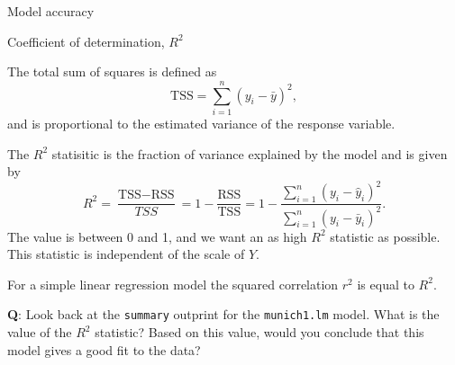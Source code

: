 \documentclass[ignorenonframetext,]{beamer}
\begin{document}
\begin{frame}

\begin{block}{Model accuracy}

\begin{block}{Coefficient of determination, \(R^2\)}

The total sum of squares is defined as
\[\text{TSS} = \sum_{i=1}^n (y_i - \bar{y})^2,\] and is proportional to
the estimated variance of the response variable.

The \(R^2\) statisitic is the fraction of variance explained by the
model and is given by
\[R^2 = \frac{\text{TSS}-\text{RSS}}{TSS}= 1-\frac{\text{RSS}}{\text{TSS}}=1-\frac{\sum_{i=1}^n(y_i-\hat{y}_i)^2}{\sum_{i=1}^n(y_i-\bar{y}_i)^2}.\]
The value is between 0 and 1, and we want an as high \(R^2\) statistic
as possible. This statistic is independent of the scale of \(Y\).

\end{block}

\end{block}

\end{frame}

\begin{frame}[fragile]

For a simple linear regression model the squared correlation \(r^2\) is
equal to \(R^2\).

\textbf{Q}: Look back at the \texttt{summary} outprint for the
\texttt{munich1.lm} model. What is the value of the \(R^2\) statistic?
Based on this value, would you conclude that this model gives a good fit
to the data?

\end{frame}
\end{document}
